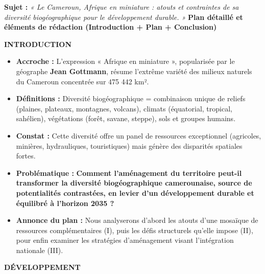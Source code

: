 \documentclass[11pt]{article}
\begin{document}
\begin{exoresolu}
\textbf{Sujet :} \emph{« Le Cameroun, Afrique en miniature : atouts et contraintes de sa diversité biogéographique pour le développement durable. »}
\tcblower
\textbf{Plan détaillé et éléments de rédaction (Introduction + Plan + Conclusion)}

\textbf{INTRODUCTION}
\begin{itemize}
    \item \textbf{Accroche :} L'expression « Afrique en miniature », popularisée par le géographe \textbf{Jean Gottmann}, résume l'extrême variété des milieux naturels du Cameroun concentrée sur 475 442 km².
    \item \textbf{Définitions :} Diversité biogéographique = combinaison unique de reliefs (plaines, plateaux, montagnes, volcans), climats (équatorial, tropical, sahélien), végétations (forêt, savane, steppe), sols et groupes humains.
    \item \textbf{Constat :} Cette diversité offre un panel de ressources exceptionnel (agricoles, minières, hydrauliques, touristiques) mais génère des disparités spatiales fortes.
    \item \textbf{Problématique :} \textbf{Comment l'aménagement du territoire peut-il transformer la diversité biogéographique camerounaise, source de potentialités contrastées, en levier d'un développement durable et équilibré à l'horizon 2035 ?}
    \item \textbf{Annonce du plan :} Nous analyserons d'abord les atouts d'une mosaïque de ressources complémentaires (I), puis les défis structurels qu'elle impose (II), pour enfin examiner les stratégies d'aménagement visant l'intégration nationale (III).
\end{itemize}

\textbf{DÉVELOPPEMENT}


\end{exoresolu}
\end{document}
